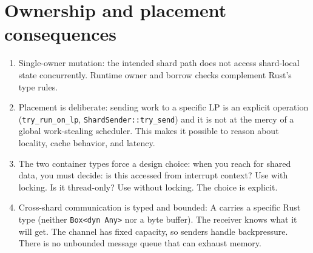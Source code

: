 \section{Ownership and placement consequences}

\begin{enumerate}
    \item Single-owner mutation: the intended shard path does not access
        shard-local state concurrently. Runtime owner and borrow checks complement
        Rust's type rules.

    \item Placement is deliberate: sending work to a
        specific LP is an explicit operation (\texttt{try\_run\_on\_lp},
        \texttt{ShardSender::try\_send}) and it is not at the mercy of a global
        work-stealing scheduler. This makes it possible to reason about locality,
        cache behavior, and latency.

    \item The two container types force a design choice: when you reach
        for shared data, you must decide: is this accessed from interrupt context?
        Use  with locking. Is it thread-only? Use
         without locking. The choice is explicit.

    \item Cross-shard communication is typed and bounded: A
         carries a specific Rust type (neither
        \texttt{Box<dyn Any>} nor a byte buffer). The receiver knows what it will
        get. The channel has fixed capacity, so senders handle backpressure. There
        is no unbounded message queue that can exhaust memory.
\end{enumerate}

\endinput
